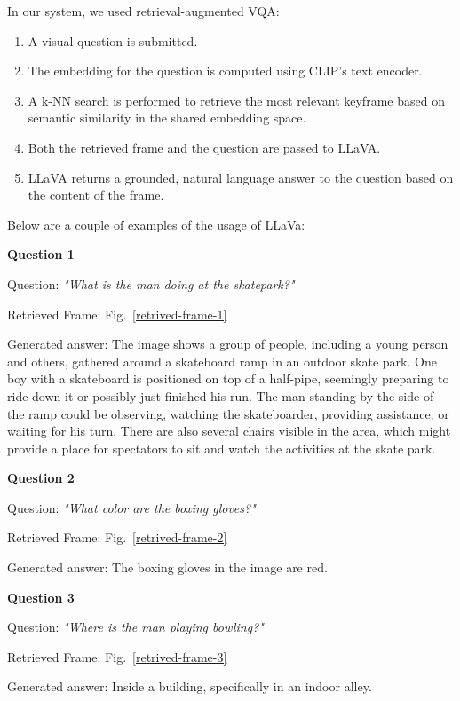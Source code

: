 \documentclass[runningheads]{llncs}
\begin{document}
In our system, we used retrieval-augmented VQA:

\begin{enumerate}
    \item A visual question is submitted.

    \item The embedding for the question is computed using CLIP's text encoder.

    \item A k-NN search is performed to retrieve the most relevant keyframe based on semantic similarity in the shared embedding space.

    \item Both the retrieved frame and the question are passed to LLaVA.

    \item LLaVA returns a grounded, natural language answer to the question based on the content of the frame.
\end{enumerate}

Below are a couple of examples of the usage of LLaVa:

\textbf{Question 1}

Question: \textit{"What is the man doing at the skatepark?"}

Retrieved Frame: Fig.~\ref{retrived-frame-1}

Generated answer: The image shows a group of people, including a young person and others, gathered around a skateboard ramp in an outdoor skate park. One boy with a skateboard is positioned on top of a half-pipe, seemingly preparing to ride down it or possibly just finished his run. The man standing by the side of the ramp could be observing, watching the skateboarder, providing assistance, or waiting for his turn. There are also several chairs visible in the area, which might provide a place for spectators to sit and watch the activities at the skate park.

\textbf{Question 2}

Question: \textit{"What color are the boxing gloves?"}

Retrieved Frame: Fig.~\ref{retrived-frame-2}

Generated answer: The boxing gloves in the image are red.

\textbf{Question 3}

Question: \textit{"Where is the man playing bowling?"}

Retrieved Frame: Fig.~\ref{retrived-frame-3}

Generated answer: Inside a building, specifically in an indoor alley.
\end{document}
